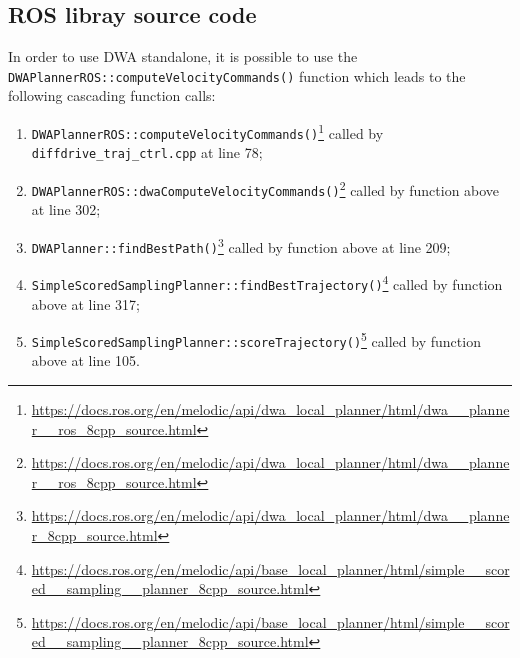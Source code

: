 \documentclass[11pt,a4paper]{article}
\begin{document}

\subsection{ROS libray source code}

In order to use DWA standalone, it is possible to use the \texttt{DWAPlannerROS::computeVelocityCommands()} function
which leads to the following cascading function calls:\\
\begin{enumerate}

    \item \texttt{DWAPlannerROS::computeVelocityCommands()}\footnote
    {\href{https://docs.ros.org/en/melodic/api/dwa\_local\_planner/html/dwa\_\_planner\_\_ros\_8cpp\_source.html}
    {https://docs.ros.org/en/melodic/api/dwa\_local\_planner/html/dwa\_\_planner\_\_ros\_8cpp\_source.html}}
    called by \texttt{diffdrive\_traj\_ctrl.cpp} at line 78;

    \item \texttt{DWAPlannerROS::dwaComputeVelocityCommands()}\footnote
    {\href{https://docs.ros.org/en/melodic/api/dwa\_local\_planner/html/dwa\_\_planner\_\_ros\_8cpp\_source.html}
    {https://docs.ros.org/en/melodic/api/dwa\_local\_planner/html/dwa\_\_planner\_\_ros\_8cpp\_source.html}}
    called by function above at line 302;

    \item \texttt{DWAPlanner::findBestPath()}\footnote
    {\href{https://docs.ros.org/en/melodic/api/dwa\_local\_planner/html/dwa\_\_planner\_8cpp\_source.html}
    {https://docs.ros.org/en/melodic/api/dwa\_local\_planner/html/dwa\_\_planner\_8cpp\_source.html}}
    called by function above at line 209;

    \item \texttt{SimpleScoredSamplingPlanner::findBestTrajectory()}\footnote
    {\href{https://docs.ros.org/en/melodic/api/base\_local\_planner/html/simple\_\_scored\_\_sampling\_\_planner\_8cpp\_source.html}
    {https://docs.ros.org/en/melodic/api/base\_local\_planner/html/simple\_\_scored\_\_sampling\_\_planner\_8cpp\_source.html}}
    called by function above at line 317;

    \item \texttt{SimpleScoredSamplingPlanner::scoreTrajectory()}\footnote
    {\href{https://docs.ros.org/en/melodic/api/base\_local\_planner/html/simple\_\_scored\_\_sampling\_\_planner\_8cpp\_source.html}
    {https://docs.ros.org/en/melodic/api/base\_local\_planner/html/simple\_\_scored\_\_sampling\_\_planner\_8cpp\_source.html}}
    called by function above at line 105.\\

\end{enumerate}
\end{document}
